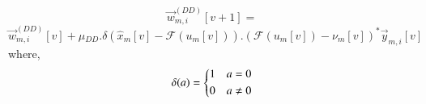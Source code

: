 \documentclass[journal,12pt,onecolumn]{IEEEtran}
\begin{document}
 \begin{equation*}
\vec{w}^{(DD)}_{m,i}[v+1] = 
 \end{equation*}
 \begin{equation*}
 \vec{w}^{(DD)}_{m,i}[v] + \mu{_{DD}}.\delta(\hat{x}_m[v]-{\mathcal{F}}(u_m[v])).({\mathcal{F}}(u_m[v]) - {\nu_m[v]})^*\vec{y}_{m,i}[v]
 \end{equation*}
 where,
\begin{align*}
\delta(a)=  \begin{dcases}
        1 & a=0 \\
        0 & a\neq 0 \\
    \end{dcases}
\end{align*} 
\end{document}
